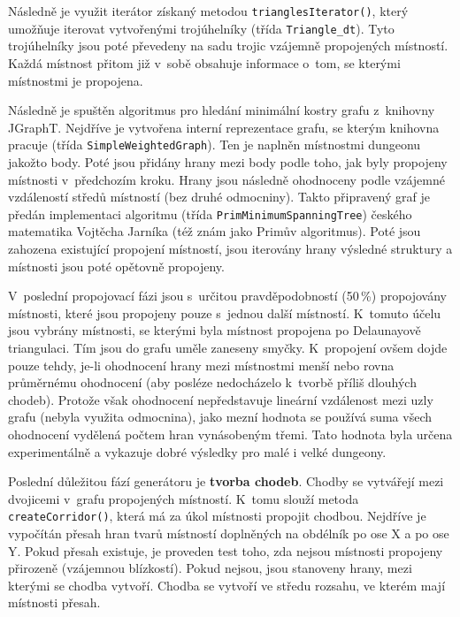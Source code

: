 Následně je využit iterátor získaný metodou \texttt{trianglesIterator()}, který umožňuje iterovat vytvořenými trojúhelníky (třída \texttt{Triangle\_dt}).
Tyto trojúhelníky jsou poté převedeny na sadu trojic vzájemně propojených místností.
Každá místnost přitom již v~sobě obsahuje informace o~tom, se kterými místnostmi je propojena.
\par
\begin{sloppypar}
Následně je spuštěn algoritmus pro hledání minimální kostry grafu z~knihovny JGraphT.
Nejdříve je vytvořena interní reprezentace grafu, se kterým knihovna pracuje (třída \texttt{SimpleWeightedGraph}).
Ten je naplněn místnostmi dungeonu jakožto body.
Poté jsou přidány hrany mezi body podle toho, jak byly propojeny místnosti v~předchozím kroku.
Hrany jsou následně ohodnoceny podle vzájemné vzdáleností středů místností (bez druhé odmocniny).
Takto připravený graf je předán implementaci algoritmu (třída \texttt{PrimMinimumSpanningTree}) českého matematika Vojtěcha Jarníka (též znám jako Primův algoritmus).
Poté jsou zahozena existující propojení místností, jsou iterovány hrany výsledné struktury a místnosti jsou poté opětovně propojeny.
\end{sloppypar}
\par
V~poslední propojovací fázi jsou s~určitou pravděpodobností (50\,\%) propojovány místnosti, které jsou propojeny pouze s~jednou další místností.
K~tomuto účelu jsou vybrány místnosti, se kterými byla místnost propojena po Delaunayově triangulaci.
Tím jsou do grafu uměle zaneseny smyčky.
K~propojení ovšem dojde pouze tehdy, je-li ohodnocení hrany mezi místnostmi menší nebo rovna průměrnému ohodnocení (aby posléze nedocházelo k~tvorbě příliš dlouhých chodeb).
Protože však ohodnocení nepředstavuje lineární vzdálenost mezi uzly grafu (nebyla využita odmocnina), jako mezní hodnota se používá suma všech ohodnocení vydělená počtem hran vynásobeným třemi.
Tato hodnota byla určena experimentálně a vykazuje dobré výsledky pro malé i velké dungeony.
\par
Poslední důležitou fází generátoru je \textbf{tvorba chodeb}.
Chodby se vytvářejí mezi dvojicemi v~grafu propojených místností.
K~tomu slouží metoda \texttt{createCorridor()}, která má za úkol místnosti propojit chodbou.
Nejdříve je vypočítán přesah hran tvarů místností doplněných na obdélník po ose X a po ose Y.
Pokud přesah existuje, je proveden test toho, zda nejsou místnosti propojeny přirozeně (vzájemnou blízkostí).
Pokud nejsou, jsou stanoveny hrany, mezi kterými se chodba vytvoří.
Chodba se vytvoří ve středu rozsahu, ve kterém mají místnosti přesah.

